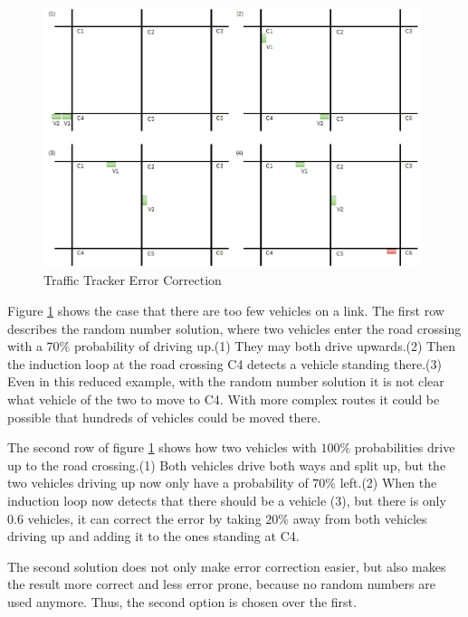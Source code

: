 \begin{figure}[!ht]
  \centering
  \includegraphics[width=11cm]{figures/errorCorrectionProblem}
  \caption[Traffic Tracker Error Correction]{Traffic Tracker Error Correction \protect\footnotemark}
  \label{trafficTrackerErrorCorrection}
\end{figure}

Figure \ref{trafficTrackerErrorCorrection} shows the case that there are too few vehicles on a link. The first row describes the random number solution, where two vehicles enter the road crossing with a $70\%$ probability of driving up.(1) They may both drive upwards.(2) Then the induction loop at the road crossing C4 detects a vehicle standing there.(3) Even in this reduced example, with the random number solution it is not clear what vehicle of the two to move to C4. With more complex routes it could be possible that hundreds of vehicles could be moved there.

The second row of figure \ref{trafficTrackerErrorCorrection} shows how two vehicles with $100\%$ probabilities drive up to the road crossing.(1) Both vehicles drive both ways and split up, but the two vehicles driving up now only have a probability of $70\%$ left.(2) When the induction loop now detects that there should be a vehicle (3), but there is only $0.6$ vehicles, it can correct the error by taking $20\%$ away from both vehicles driving up and adding it to the ones standing at C4.

The second solution does not only make error correction easier, but also makes the result more correct and less error prone, because no random numbers are used anymore. Thus, the second option is chosen over the first.

